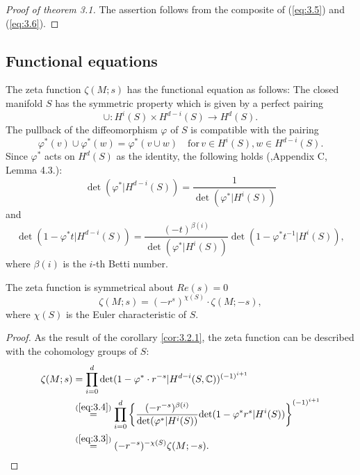 \begin{proof}[Proof of theorem 3.1]
The assertion follows from the composite of (\ref{eq:3.5}) and (\ref{eq:3.6}).
\end{proof}

\subsection{Functional equations}

The zeta function $\zeta(M;s)$ has the functional equation as follows:
The closed manifold $S$ has the symmetric property which is given by a perfect pairing
\begin{equation*}
    \cup:H^{i}(S) \times H^{d-i}(S) \rightarrow H^{d}(S).
\end{equation*}
The pullback of the diffeomorphism $\varphi$ of $S$ is compatible with the pairing
\begin{equation*}
    \varphi^{*}(v)\cup\varphi^{*}(w)=\varphi^{*}(v\cup{w})\quad\mathrm{for}\,v\in{H}^{i}(S),w\in{H}^{d-i}(S).
\end{equation*}
Since $\varphi^{*}$ acts on $H^{d}(S)$ as the identity, the following holds (\cite{Ha},Appendix C, Lemma 4.3.):
\begin{equation}\label{eq:3.3}
    \det(\varphi^{*}|H^{d-i}(S))=\frac{1}{\det(\varphi^{*}|H^{i}(S))}
\end{equation}
and
\begin{equation}\label{eq:3.4}
    \det(1-\varphi^{*}t|H^{d-i}(S))=\frac{(-t)^{\beta(i)}}{\det(\varphi^{*}|H^{i}(S))}\det(1-\varphi^{*}t^{-1}|H^{i}(S)),
\end{equation}
where $\beta(i)$ is the $i$-th Betti number.
\begin{theorem}
\label{functional_eq}
The zeta function is symmetrical about $Re(s)=0$
\begin{equation*}
    \zeta(M;s)=(-r^{s})^{\chi(S)} \cdot \zeta(M;-s),
\end{equation*}
where $\chi(S)$ is the Euler characteristic of $S$.
\end{theorem}
\begin{proof}
As the result of the corollary \ref{cor:3.2.1}, the zeta function can be described with the cohomology groups of $S$:
\begin{equation*}
    \begin{split}
            \zeta(M;s)&=\prod_{i=0}^{d}{\mathrm{det}}(1-\varphi^{*}\cdot r^{-s}|H^{d-i}(S,{\mathbb{C}}))^{(-1)^{i+1}}\\
            &\overset{(\ref{eq:3.4})}{=}\prod_{i=0}^{d}\left\{\frac{(-r^{-s})^{\beta(i)}}{{\mathrm{det}}(\varphi^{*}|H^{i}(S))}{\mathrm{det}}(1-\varphi^{*}r^{s}|H^{i}(S))\right \}^{(-1)^{i+1}}\\
            &\overset{(\ref{eq:3.3})}{=}(-r^{-s})^{-\chi(S)}\zeta(M;-s).
    \end{split}
\end{equation*}
\end{proof}



